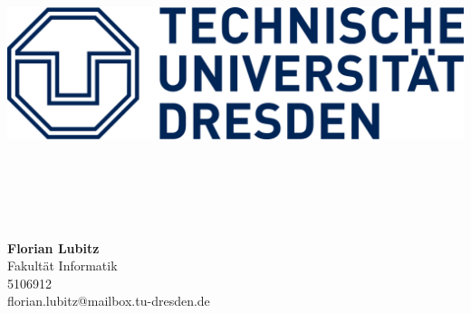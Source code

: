 \begin{titlepage}

\begin{center}
\includegraphics[scale=2.65]{./lib/logo}\\[15ex]



\large{\docusubject}\\[2ex]

\LARGE{\textbf{\docutitle}}\\[2ex]
\large{\docusubtitle}\\[3.5ex]

\normalsize

\begin{tabular}{c}

\end{tabular}\\[15ex]

\textbf{\LARGE{Florian Lubitz}}\\
Fakultät Informatik\\
5106912\\
florian.lubitz@mailbox.tu-dresden.de
\\[3ex]

\end{center}

\end{titlepage}